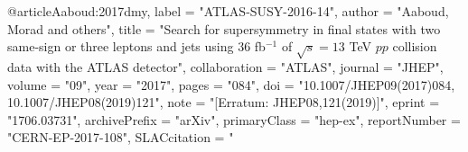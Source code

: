@article{Aaboud:2017dmy,
      label          = "ATLAS-SUSY-2016-14",
      author         = "Aaboud, Morad and others",
      title          = "{Search for supersymmetry in final states with two
                        same-sign or three leptons and jets using 36 fb$^{-1}$ of
                        $\sqrt{s}=13$ TeV $pp$ collision data with the ATLAS
                        detector}",
      collaboration  = "ATLAS",
      journal        = "JHEP",
      volume         = "09",
      year           = "2017",
      pages          = "084",
      doi            = "10.1007/JHEP09(2017)084, 10.1007/JHEP08(2019)121",
      note           = "[Erratum: JHEP08,121(2019)]",
      eprint         = "1706.03731",
      archivePrefix  = "arXiv",
      primaryClass   = "hep-ex",
      reportNumber   = "CERN-EP-2017-108",
      SLACcitation   = "%
}

